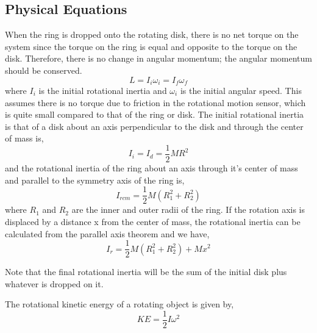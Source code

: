 \documentclass[12pt]{article}
\begin{document}
	\subsection{Physical Equations}
	When the ring is dropped onto the rotating disk, there is no net torque on the system since the torque on the ring is equal and opposite to the torque on the disk. Therefore, there is no change in angular momentum; the angular momentum should be conserved.
	\begin{equation}
		L = I_{i}\omega_{i} = I_{f}\omega_{f}
	\end{equation}
	where $I_{i}$ is the initial rotational inertia and $\omega_{i}$ is the initial angular speed. This assumes there is no torque due to friction in the rotational motion sensor, which is quite small compared to that of the ring or disk. The initial rotational inertia is that of a disk about an axis perpendicular to the disk and through the center of mass is,
	\begin{equation}
		I_i = I_d = \frac{1}{2}MR^2
	\end{equation}
	and the rotational inertia of the ring about an axis through it's center of mass and parallel to the symmetry axis of the ring is,
	\begin{equation}
		I_{rcm} = \frac{1}{2}M(R_1^2+R_2^2)
	\end{equation}
	where $R_{1}$ and $R_2$ are the inner and outer radii of the ring. If the rotation axis is displaced by a distance x from the center of mass, the rotational inertia can be calculated from the parallel axis theorem and we have,
	\begin{equation}
		I_r = \frac{1}{2}M(R_1^2+R_2^2)+Mx^2
	\end{equation}\par 
	Note that the final rotational inertia will be the sum of the initial disk plus whatever is dropped on it.\par 
	The rotational kinetic energy of a rotating object is given by, 
	\begin{equation}
		KE = \frac{1}{2} I \omega^2
	\end{equation}
\end{document}
